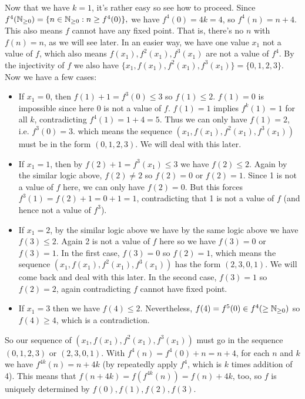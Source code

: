 \documentclass[11pt,a4paper]{article}
\begin{document}
\begin{enumerate}
    Now that we have $k=1$, it's rather easy so see how to proceed. Since $f^4(\mathbb{N}_{\ge 0})=\{n\in \mathbb{N}_{\ge 0}: n\ge f^4(0)\},$ we have $f^4(0)=4k=4$, so $f^4(n)=n+4$. This also means $f$ cannot have any fixed point. That is, there's no $n$ with $f(n)=n$, as we will see later. 
    In an easier way, we have one value $x_1$ not a value of $f$, which also means $f(x_1), f^2(x_1), f^3(x_1)$ are not a value of $f^4$. 
    By the injectivity of $f$ we also have $\{x_1, f(x_1), f^2(x_1), f^3(x_1)\}=\{0, 1, 2, 3\}$. Now we have a few cases: 
    \begin{itemize}
    	\item If $x_1=0$, then $f(1)+1=f^3(0)\le 3$ so $f(1)\le 2$. $f(1)=0$ is impossible since here $0$ is not a value of $f$. $f(1)=1$ implies $f^k(1)=1$ for all $k$, contradicting $f^4(1)=1+4=5$. 
    	Thus we can only have $f(1)=2$, i.e. $f^3(0)=3$.  which means the sequence $(x_1, f(x_1), f^2(x_1), f^3(x_1))$ must be in the form $(0, 1, 2, 3)$. We will deal with this later. 
    	
    	\item If $x_1=1$, then by $f(2)+1=f^3(x_1)\le 3$ we have $f(2)\le 2$. Again by the similar logic above, $f(2)\neq 2$ so $f(2)=0$ or $f(2)=1$. Since 1 is not a value of $f$ here, we can only have $f(2)=0$. 
    	But this forces $f^3(1)=f(2)+1=0+1=1$, contradicting that 1 is not a value of $f$ (and hence not a value of $f^3$). 
    	
    	\item If $x_1=2$, by the similar logic above we have by the same logic above we have $f(3)\le 2$. Again 2 is not a value of $f$ here so we have $f(3)=0$ or $f(3)=1$. 
    	In the first case, $f(3)=0$ so $f(2)=1$, which means the sequence $(x_1, f(x_1), f^2(x_1), f^3(x_1))$ has the form $(2, 3, 0, 1)$. We will come back and deal with this later. 
    	In the second case, $f(3)=1$ so $f(2)=2$, again contradicting $f$ cannot have fixed point. 
    	
    	\item If $x_1=3$ then we have $f(4)\le 2$. Nevertheless, $f(4)=f^5(0)\in f^4(\ge\mathbb{N}_{\ge 0})$ so $f(4)\ge 4$, which is a contradiction. 
    \end{itemize}
\end{enumerate}
	So our sequence of $(x_1, f(x_1), f^2(x_1), f^3(x_1))$ must go in the sequence $(0, 1, 2, 3)$ or $(2, 3, 0, 1)$. 
	With $f^4(n)=f^4(0)+n=n+4$, for each $n$ and $k$ we have $f^{4k}(n)=n+4k$ (by repeatedly apply $f^4$, which is $k$ times addition of 4). 
	This means that $f(n+4k)=f(f^{4k}(n))=f(n)+4k$, too, so $f$ is uniquely determined by $f(0), f(1), f(2), f(3)$. 
\end{document}
